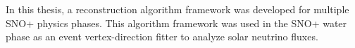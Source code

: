 In this thesis, a reconstruction algorithm framework was developed for multiple SNO+ physics phases. This algorithm framework was used in the SNO+ water phase as an event vertex-direction fitter to analyze solar neutrino fluxes.
